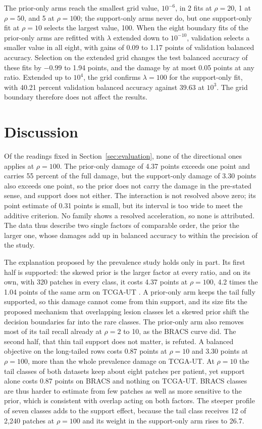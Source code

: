 The prior-only arms reach the smallest grid value, $10^{-6}$, in 2 fits at $\rho=20$, 1 at $\rho=50$, and 5 at $\rho=100$; the support-only arms never do, but one support-only fit at $\rho=10$ selects the largest value, 100. When the eight boundary fits of the prior-only arms are refitted with $\lambda$ extended down to $10^{-10}$, validation selects a smaller value in all eight, with gains of 0.09 to 1.17 points of validation balanced accuracy. Selection on the extended grid changes the test balanced accuracy of these fits by $-0.99$ to 1.94 points, and the damage by at most 0.05 points at any ratio. Extended up to $10^{4}$, the grid confirms $\lambda=100$ for the support-only fit, with 40.21 percent validation balanced accuracy against 39.63 at $10^{3}$. The grid boundary therefore does not affect the results.

\section{Discussion}
\label{sec:discussion}
Of the readings fixed in Section~\ref{sec:evaluation}, none of the directional ones applies at $\rho=100$. The prior-only damage of 4.37 points exceeds one point and carries 55 percent of the full damage, but the support-only damage of 3.30 points also exceeds one point, so the prior does not carry the damage in the pre-stated sense, and support does not either. The interaction is not resolved above zero; its point estimate of 0.31 points is small, but its interval is too wide to meet the additive criterion. No family shows a resolved acceleration, so none is attributed. The data thus describe two single factors of comparable order, the prior the larger one, whose damages add up in balanced accuracy to within the precision of the study.

The explanation proposed by the prevalence study holds only in part. Its first half is supported: the skewed prior is the larger factor at every ratio, and on its own, with 320 patches in every class, it costs 4.37 points at $\rho=100$, 4.2 times the 1.04 points of the same arm on TCGA-UT \citep{queisler2026causeTcga}. A prior-only arm keeps the tail fully supported, so this damage cannot come from thin support, and its size fits the proposed mechanism that overlapping lesion classes let a skewed prior shift the decision boundaries far into the rare classes. The prior-only arm also removes most of its tail recall already at $\rho=2$ to 10, as the BRACS curve did. The second half, that thin tail support does not matter, is refuted. A balanced objective on the long-tailed rows costs 0.87 points at $\rho=10$ and 3.30 points at $\rho=100$, more than the whole prevalence damage on TCGA-UT. At $\rho=10$ the tail classes of both datasets keep about eight patches per patient, yet support alone costs 0.87 points on BRACS and nothing on TCGA-UT. BRACS classes are thus harder to estimate from few patches as well as more sensitive to the prior, which is consistent with overlap acting on both factors. The steeper profile of seven classes adds to the support effect, because the tail class receives 12 of 2,240 patches at $\rho=100$ and its weight in the support-only arm rises to 26.7.

